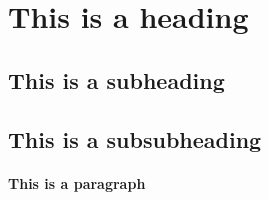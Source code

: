\documentclass[../Main.tex]{subfiles}
\begin{document}
\section{This is a heading}

\lipsum[10-14] %

\subsection{This is a subheading}

\lipsum[15-17] %

\subsection{This is a subsubheading}

\lipsum[18-19] %

\paragraph{This is a paragraph}

\lipsum[20-21] %


\biblio %
\end{document}
